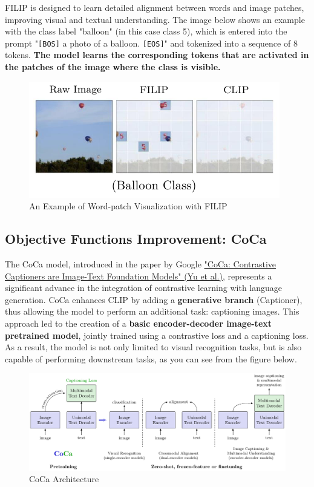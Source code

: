 FILIP is designed to learn detailed alignment between words and image patches, improving visual and textual understanding. The image below shows an example with the class label "balloon" (in this case class 5), which is entered into the prompt "\texttt{[BOS]} a photo of a balloon. \texttt{[EOS]}" and tokenized into a sequence of 8 tokens. \textbf{The model learns the corresponding tokens that are activated in the patches of the image where the class is visible.} 

\begin{figure}[!htbp]
    \centering
    \includegraphics[width=0.6\linewidth]{tikz/chapter11 - FILIP vs CLIP.pdf}
    \caption{An Example of Word-patch Visualization with FILIP}
\end{figure}


\subsection{Objective Functions Improvement: CoCa}

The CoCa model, introduced in the paper by Google \href{https://arxiv.org/pdf/2205.01917}{"CoCa: Contrastive Captioners are Image-Text Foundation Models" (Yu et al.)}, represents a significant advance in the integration of contrastive learning with language generation. CoCa enhances CLIP by adding a \textbf{generative branch} (Captioner), thus allowing the model to perform an additional task: captioning images. This approach led to the creation of a \textbf{basic encoder-decoder image-text pretrained model}, jointly trained using a contrastive loss and a captioning loss. As a result, the model is not only limited to visual recognition tasks, but is also capable of performing downstream tasks, as you can see from the figure below.

\begin{figure}[!htbp]
    \centering
    \includegraphics[width=\linewidth]{tikz/chapter11 - CoCa.pdf}
    \caption{CoCa Architecture}
\end{figure}

